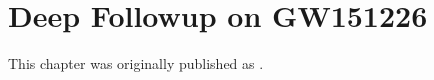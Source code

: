 \chapter[GW151226 Deep-Followup]{Deep Followup on GW151226}
\label{cp.deep}

This chapter was originally published as \cite{}.


